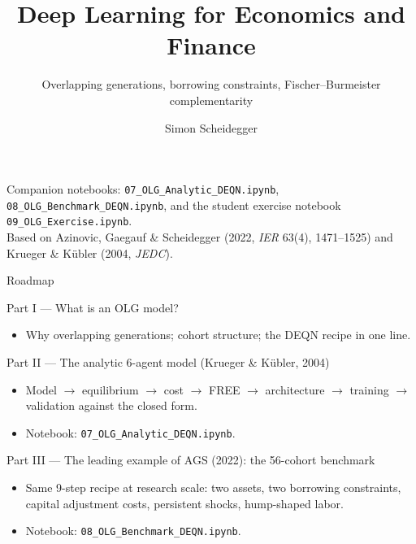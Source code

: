 \documentclass[aspectratio=169,11pt]{beamer}
\title[Deep Learning for Dynamic Economic Models]
{Deep Learning for Economics and Finance}
\subtitle{Overlapping generations, borrowing constraints, Fischer--Burmeister complementarity}
\author{Simon Scheidegger}
\institute[HEC Lausanne]{HEC, University of Lausanne}
\date{}
\begin{document}
{
\begin{frame}
\titlepage
\vspace{-0.4cm}
\begin{center}
{\footnotesize Companion notebooks: \texttt{07\_OLG\_Analytic\_DEQN.ipynb}, \texttt{08\_OLG\_Benchmark\_DEQN.ipynb}, and the student exercise notebook \texttt{09\_OLG\_Exercise.ipynb}.}\\[3pt]
{\footnotesize Based on Azinovic, Gaegauf \& Scheidegger (2022, \emph{IER} 63(4), 1471--1525) and Krueger \& K\"ubler (2004, \emph{JEDC}).}
\end{center}
\end{frame}
}

\begin{frame}{Roadmap}
\footnotesize
\begin{block}{Part I --- What is an OLG model?}
\vspace{-3pt}\begin{itemize}\itemsep0pt
    \item Why overlapping generations; cohort structure; the DEQN recipe in one line.
\end{itemize}
\end{block}
\vspace{-2pt}
\begin{block}{Part II --- The analytic 6-agent model (Krueger \& K\"ubler, 2004)}
\vspace{-3pt}\begin{itemize}\itemsep0pt
    \item Model $\to$ equilibrium $\to$ cost $\to$ FREE $\to$ architecture $\to$ training $\to$ validation against the closed form.
    \item Notebook: \texttt{07\_OLG\_Analytic\_DEQN.ipynb}.
\end{itemize}
\end{block}
\vspace{-2pt}
\begin{block}{Part III --- The leading example of AGS (2022): the 56-cohort benchmark}
\vspace{-3pt}\begin{itemize}\itemsep0pt
    \item Same 9-step recipe at research scale: two assets, two borrowing constraints, capital adjustment costs, persistent shocks, hump-shaped labor.
    \item Notebook: \texttt{08\_OLG\_Benchmark\_DEQN.ipynb}.
\end{itemize}
\end{block}
\end{frame}
\end{document}

